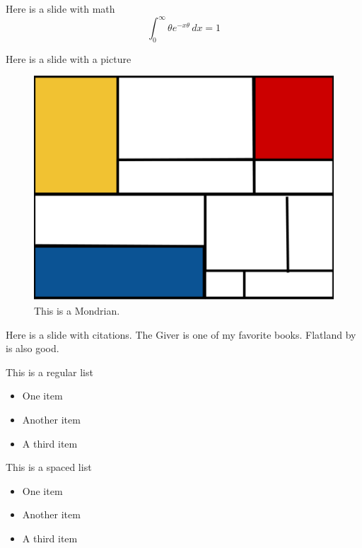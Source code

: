 \begin{frame}{Here is a slide with math}
  $$\int_0^\infty \theta e^{-x\theta}\, dx = 1$$
\end{frame}

\begin{frame}{Here is a slide with a picture}
  \begin{figure}
    \centering
    \includegraphics[scale=0.2]{img/mondrian.png}
    \caption{This is a Mondrian.}
  \end{figure}
\end{frame}

\begin{frame}{Here is a slide with citations.}
  The Giver \citep{lowry1993giver} is one of my favorite books.
  Flatland by \cite{abbott1884flatland} is also good.
\end{frame}


\begin{frame}
  \begin{block}{This is a regular list}
    \begin{itemize}
      \item One item
      \item Another item
      \item A third item
    \end{itemize}
  \end{block}

   \begin{block}{This is a spaced list}
    \begin{itemize}
      \setlength\itemsep{1em}
      \item One item
      \item Another item
      \item A third item
    \end{itemize}
  \end{block}

 
\end{frame}
